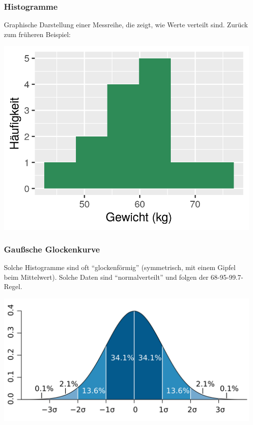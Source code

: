 \documentclass{beamer}
\begin{document}
\begin{frame}
\frametitle{Histogramme}

Graphische Darstellung einer Messreihe, die zeigt, wie Werte verteilt sind. Zurück zum früheren Beispiel:


\begin{center}
\includegraphics{histogram.png}
\end{center}


\end{frame}

\begin{frame}
\frametitle{Gaußsche Glockenkurve}

Solche Histogramme sind oft ``glockenförmig'' (symmetrisch, mit einem Gipfel beim Mittelwert). Solche Daten sind ``normalverteilt'' und folgen der 68-95-99.7-Regel.


\begin{center}
\includegraphics[width=\textwidth]{empirical_rule.png}
\end{center}





\end{frame}
\end{document}
